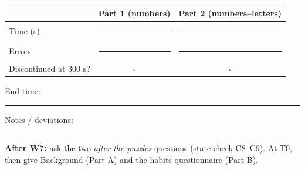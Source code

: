 \documentclass[10pt,a4paper]{article}
\newcommand{\blank}[1][1.2cm]{\rule{#1}{0.4pt}}
\newcommand{\bx}{$\square$}
\begin{document}
\begin{tabular}{@{}lcc@{}}\toprule & Part 1 (numbers) & Part 2 (numbers--letters)\\ \midrule
Time (s) & \blank & \blank\\ Errors & \blank & \blank\\ Discontinued at 300 s? & \bx & \bx\\ \bottomrule\end{tabular}

\vspace{6pt}End time: \blank[2cm] \qquad Notes / deviations: \blank[9cm]

\textbf{After W7:} ask the two \emph{after the puzzles} questions (state check C8--C9). At T0, then give Background (Part A) and the habits questionnaire (Part B).
\end{document}
